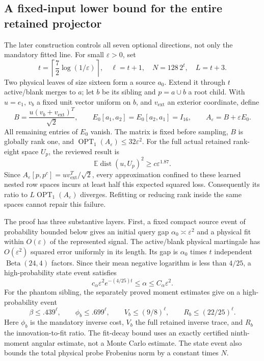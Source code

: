 \documentclass[11pt,oneside,openany,a4paper]{book}
\numberwithin{equation}{chapter}
\theoremstyle{definition}
\theoremstyle{remark}
\begin{document}
\subsection{A fixed-input lower bound for the entire retained projector}

The later construction controls all seven optional directions, not
only the mandatory fitted line.  For small $\varepsilon>0$, set
\[
 t=\left\lceil\frac72\log(1/\varepsilon)\right\rceil,
 \quad\ell=t+1,\quad N=128\,2^t,\quad L=t+3.
\]
Two physical leaves of size sixteen form a source $a_0$.  Extend it
through $t$ active/blank merges to $a$; let $b$ be its sibling and
$p=a\cup b$ a root child.  With $u=e_1$, $v_b$ a fixed unit vector
uniform on $b$, and $v_{\mathrm{ext}}$ an exterior coordinate, define
\[
 B=\frac{u(v_b+v_{\mathrm{ext}})^T}{\sqrt2},\qquad
 E_0[a_1,a_2]=E_0[a_2,a_1]=I_{16},\qquad
 A_\varepsilon=B+\varepsilon E_0.
\]
All remaining entries of $E_0$ vanish.  The matrix is fixed before
sampling, $B$ is globally rank one, and
$\operatorname{OPT}_1(A_\varepsilon)\le32\varepsilon^2$.
For the full actual retained rank-eight space $U_p$, the reviewed result
is
\[
 \mathbb E\operatorname{dist}(u,U_p)^2
 \ge c\varepsilon^{1.87}.
 \tag{\thechapter.2}
\]
Since $A_\varepsilon[p,p^c]=uv_{\mathrm{ext}}^T/\sqrt2$, every
approximation confined to these learned nested row spaces incurs at
least half this expected squared loss.  Consequently its ratio to
$L\operatorname{OPT}_1(A_\varepsilon)$ diverges.  Refitting or reducing
rank inside the same spaces cannot repair this failure.

The proof has three substantive layers.  First, a fixed compact source
event of probability bounded below gives an initial query gap
$\alpha_0\asymp\varepsilon^2$ and a physical fit within
$O(\varepsilon)$ of the represented signal.  The active/blank physical
martingale has $O(\varepsilon^2)$ squared error uniformly in its length.
Its gap is $\alpha_0$ times $t$ independent
$\operatorname{Beta}(24,4)$ factors.  Since their mean negative
logarithm is less than $4/25$, a high-probability state event satisfies
\[
 c_\alpha\varepsilon^2e^{-(4/25)t}
 \le\alpha\le C_\alpha\varepsilon^2.
\]
For the phantom sibling, the separately proved moment estimates give
on a high-probability event
\[
 \beta\le .439^\ell,\qquad \phi_b\le .699^\ell,\qquad
 V_b\le(9/8)^\ell,\qquad R_b\le(22/25)^\ell.
\]
Here $\phi_b$ is the mandatory inverse cost, $V_b$ the full retained
inverse trace, and $R_b$ the innovation-to-fit ratio.  The fit-decay
bound uses an exactly certified ninth-moment angular estimate, not a
Monte Carlo estimate.  The state event also bounds the total physical
probe Frobenius norm by a constant times $N$.
\end{document}
